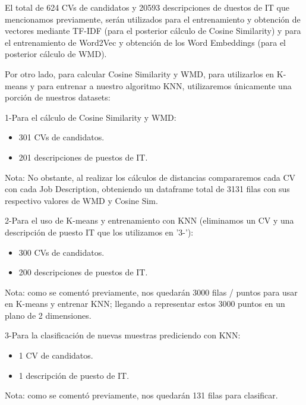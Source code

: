 \documentclass[12pt,a4paper]{article}
\begin{document}
El total de 624 CVs de candidatos y 20593 descripciones de duestos de IT que mencionamos previamente, serán utilizados para el entrenamiento y obtención de vectores mediante TF-IDF (para el posterior cálculo de Cosine Similarity) y para el entrenamiento de Word2Vec y obtención de los Word Embeddings (para el posterior cálculo de WMD).

Por otro lado, para calcular Cosine Similarity y WMD, para utilizarlos en K-means y para entrenar a nuestro algoritmo KNN, utilizaremos únicamente una porción de nuestros datasets:

1-Para el cálculo de Cosine Similarity y WMD:
\begin{itemize}
\item 301 CVs de candidatos.
\item 201 descripciones de puestos de IT.
\end{itemize}
Nota: No obstante, al realizar los cálculos de distancias compararemos cada CV con cada Job Description, obteniendo un dataframe total de 3131 filas con sus respectivo valores de WMD y Cosine Sim.

2-Para el uso de K-means y entrenamiento con KNN (eliminamos un CV y una descripción de puesto IT que los utilizamos en '3-'):
\begin{itemize}
\item 300 CVs de candidatos.
\item 200 descripciones de puestos de IT.
\end{itemize}        
Nota: como se comentó previamente, nos quedarán 3000 filas / puntos para usar en K-means y entrenar KNN; llegando a representar estos 3000 puntos en un plano de 2 dimensiones.

3-Para la clasificación de nuevas muestras prediciendo con KNN:
\begin{itemize}
\item 1 CV de candidatos.
\item 1 descripción de puesto de IT.
\end{itemize}
Nota: como se comentó previamente, nos quedarán 131 filas para clasificar.
\end{document}
